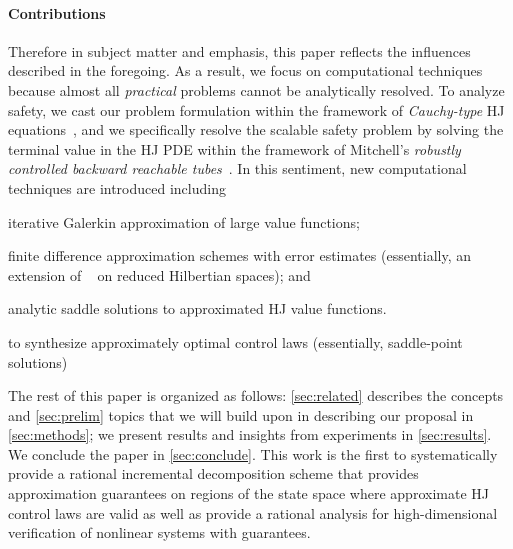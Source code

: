 \paragraph{Contributions} Therefore in subject matter and emphasis, this paper reflects the influences described in the foregoing. 
As a result, we focus on computational techniques because almost all \textit{practical} problems cannot be analytically resolved. 
To analyze safety, we cast our problem formulation within the framework of \textit{Cauchy-type} HJ equations~\cite{Crandall1983viscosity}, and we specifically resolve the scalable safety problem by solving the terminal value in the HJ PDE within the framework of Mitchell's \textit{robustly controlled backward reachable tubes}~\cite{Mitchell2020}. %
In this sentiment, new computational techniques are introduced including
%
\begin{inparaenum}[(i)]
	\item iterative Galerkin approximation of large value functions;
	\item finite difference approximation schemes with error estimates (essentially, an extension of ~\cite{Crandall1984} on reduced Hilbertian spaces); and
	\item  analytic saddle solutions to approximated HJ value functions.
\end{inparaenum} 
%
to synthesize approximately optimal control laws (essentially, saddle-point solutions) 

The rest of this paper is organized as follows: \autoref{sec:related} describes the concepts and \autoref{sec:prelim} topics that we will build upon in describing our proposal in \autoref{sec:methods}; we present results and insights from experiments in \autoref{sec:results}. 
We conclude the paper in \autoref{sec:conclude}. This work is the first to systematically provide a rational incremental decomposition scheme that provides approximation guarantees on regions of the state space where approximate HJ control laws are valid as well as provide a rational analysis for high-dimensional verification of nonlinear systems with guarantees.  %